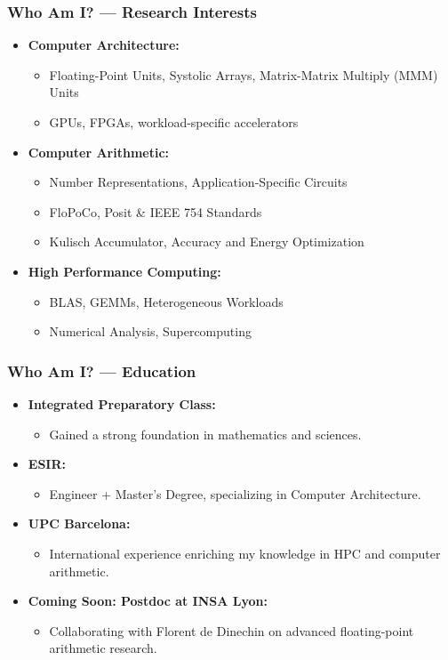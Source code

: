 \begin{frame}
	\frametitle{Who Am I? — Research Interests}
	\begin{itemize}
		\item \textbf{Computer Architecture:}
		\begin{itemize}
			\item Floating-Point Units, Systolic Arrays, Matrix-Matrix Multiply (MMM) Units
			\item GPUs, FPGAs, workload-specific accelerators
		\end{itemize}
		\item \textbf{Computer Arithmetic:}
		\begin{itemize}
			\item Number Representations, Application-Specific Circuits
			\item FloPoCo, Posit & IEEE 754 Standards
			\item Kulisch Accumulator, Accuracy and Energy Optimization
		\end{itemize}
		\item \textbf{High Performance Computing:}
		\begin{itemize}
			\item BLAS, GEMMs, Heterogeneous Workloads
			\item Numerical Analysis, Supercomputing
		\end{itemize}
	\end{itemize}
\end{frame}

\begin{frame}
	\frametitle{Who Am I? — Education}
	\begin{itemize}
		\item \textbf{Integrated Preparatory Class:}
		\begin{itemize}
			\item Gained a strong foundation in mathematics and sciences.
		\end{itemize}
		\item \textbf{ESIR:}
		\begin{itemize}
			\item Engineer + Master's Degree, specializing in Computer Architecture.
		\end{itemize}
		\item \textbf{UPC Barcelona:}
		\begin{itemize}
			\item International experience enriching my knowledge in HPC and computer arithmetic.
		\end{itemize}
		\item \textbf{Coming Soon: Postdoc at INSA Lyon:}
		\begin{itemize}
			\item Collaborating with Florent de Dinechin on advanced floating-point arithmetic research.
		\end{itemize}
	\end{itemize}
\end{frame}


